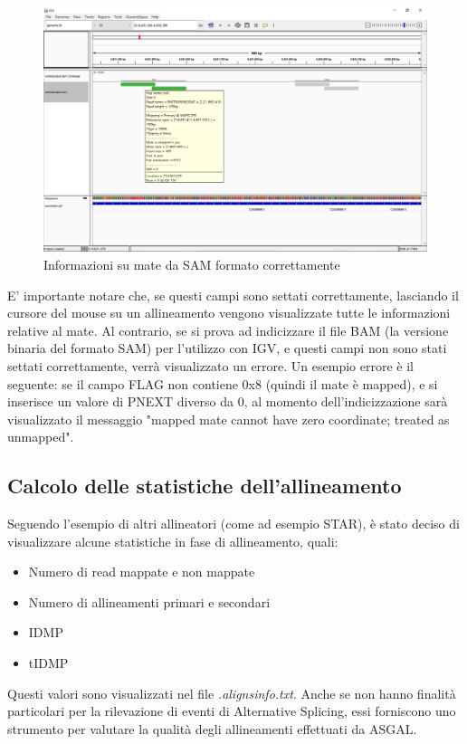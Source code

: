 \begin{figure}[h]
	\centering
	\includegraphics[width=\linewidth]{images/mateinfo.png}
  \caption{Informazioni su mate da SAM formato correttamente}
  \label{fig:Mate info}
\end{figure}

\newpage

E' importante notare che, se questi campi sono settati correttamente, lasciando il cursore del mouse su un allineamento vengono visualizzate tutte le informazioni relative al mate. Al contrario, se si prova ad indicizzare il file BAM (la versione binaria del formato SAM) per l'utilizzo con IGV, e questi campi non sono stati settati correttamente, verrà visualizzato un errore. Un esempio errore è il seguente: se il campo FLAG non contiene 0x8 (quindi il mate è mapped), e si inserisce un valore di PNEXT diverso da 0, al momento dell'indicizzazione sarà visualizzato il messaggio "mapped mate cannot have zero coordinate; treated as unmapped".

\subsection{Calcolo delle statistiche dell'allineamento}
Seguendo l'esempio di altri allineatori (come ad esempio STAR), è stato deciso di visualizzare alcune statistiche in fase di allineamento, quali:

\begin{itemize}
	\item Numero di read mappate e non mappate
	\item Numero di allineamenti primari e secondari
	\item IDMP
	\item tIDMP
\end{itemize}

Questi valori sono visualizzati nel file \textit{.alignsinfo.txt}. Anche se non hanno finalità particolari per la rilevazione di eventi di Alternative Splicing, essi forniscono uno strumento per valutare la qualità degli allineamenti effettuati da ASGAL.
\newpage